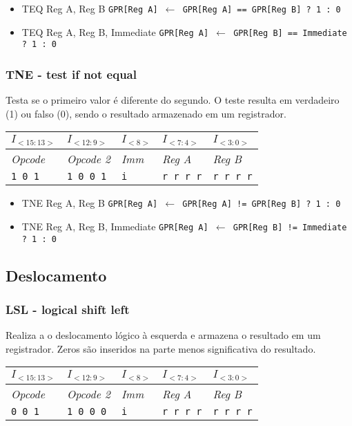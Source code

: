 \documentclass[11pt,a4paper]{report}
\begin{document}
\begin{itemize}
\item TEQ Reg A, Reg B
\subitem \texttt{GPR[Reg A] $\leftarrow$ GPR[Reg A] == GPR[Reg B] ? 1 : 0}
\item TEQ Reg A, Reg B, Immediate
\subitem \texttt{GPR[Reg A] $\leftarrow$ GPR[Reg B] == Immediate ? 1 : 0}
\end{itemize}

\subsubsection{TNE - test if not equal}
Testa se o primeiro valor é diferente do segundo. O teste resulta em
verdadeiro (1) ou falso (0), sendo o resultado armazenado em um
registrador.

\begin{table}[htb!]
\centering
\begin{tabular}{|p{2cm}|p{2cm}|p{2cm}|p{2cm}|p{2cm}|}
\hline
$I_{<15:13>}$ & $I_{<12:9>}$ & $I_{<8>}$ & $I_{<7:4>}$ & $I_{<3:0>}$  \\ \hline
\textit{Opcode} & \textit{Opcode 2} & \textit{Imm} & \textit{Reg A} & \textit{Reg B} \\ \hline
\texttt{1 0 1} & \texttt{1 0 0 1} & \texttt{i} & \texttt{r r r r} & \texttt{r r r r} \\ \hline
\end{tabular}
\end{table}

\begin{itemize}
\item TNE Reg A, Reg B
\subitem \texttt{GPR[Reg A] $\leftarrow$ GPR[Reg A] != GPR[Reg B] ? 1 : 0}
\item TNE Reg A, Reg B, Immediate
\subitem \texttt{GPR[Reg A] $\leftarrow$ GPR[Reg B] != Immediate ? 1 : 0}
\end{itemize}


\subsection{Deslocamento}

\subsubsection{LSL - logical shift left}
Realiza a o deslocamento lógico à esquerda e armazena o resultado em um
registrador. Zeros são inseridos na parte menos significativa do
resultado.

\begin{table}[htb!]
\centering
\begin{tabular}{|p{2cm}|p{2cm}|p{2cm}|p{2cm}|p{2cm}|}
\hline
$I_{<15:13>}$ & $I_{<12:9>}$ & $I_{<8>}$ & $I_{<7:4>}$ & $I_{<3:0>}$  \\ \hline
\textit{Opcode} & \textit{Opcode 2} & \textit{Imm} & \textit{Reg A} & \textit{Reg B} \\ \hline
\texttt{0 0 1} & \texttt{1 0 0 0} & \texttt{i} & \texttt{r r r r} & \texttt{r r r r} \\ \hline
\end{tabular}
\end{table}
\end{document}
